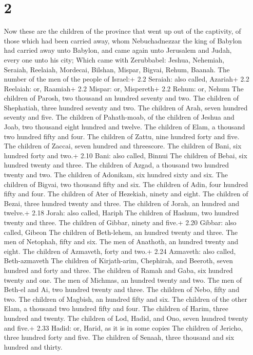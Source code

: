 \hypertarget{section-1}{%
\section{2}\label{section-1}}

 Now these are the children of the province that went up out
of the captivity, of those which had been carried away, whom
Nebuchadnezzar the king of Babylon had carried away unto Babylon, and
came again unto Jerusalem and Judah, every one unto his city;
 Which came with Zerubbabel: Jeshua, Nehemiah, Seraiah,
Reelaiah, Mordecai, Bilshan, Mispar, Bigvai, Rehum, Baanah. The number
of the men of the people of Israel:+ 2.2 Seraiah: also called, Azariah+
2.2 Reelaiah: or, Raamiah+ 2.2 Mispar: or, Mispereth+ 2.2 Rehum: or,
Nehum  The children of Parosh, two thousand an hundred
seventy and two.  The children of Shephatiah, three hundred
seventy and two.  The children of Arah, seven hundred
seventy and five.  The children of Pahath-moab, of the
children of Jeshua and Joab, two thousand eight hundred and twelve.
 The children of Elam, a thousand two hundred fifty and
four.  The children of Zattu, nine hundred forty and five.
 The children of Zaccai, seven hundred and threescore.
 The children of Bani, six hundred forty and two.+ 2.10
Bani: also called, Binnui  The children of Bebai, six
hundred twenty and three.  The children of Azgad, a
thousand two hundred twenty and two.  The children of
Adonikam, six hundred sixty and six.  The children of
Bigvai, two thousand fifty and six.  The children of Adin,
four hundred fifty and four.  The children of Ater of
Hezekiah, ninety and eight.  The children of Bezai, three
hundred twenty and three.  The children of Jorah, an
hundred and twelve.+ 2.18 Jorah: also called, Hariph  The
children of Hashum, two hundred twenty and three.  The
children of Gibbar, ninety and five.+ 2.20 Gibbar: also called, Gibeon
 The children of Beth-lehem, an hundred twenty and three.
 The men of Netophah, fifty and six.  The men
of Anathoth, an hundred twenty and eight.  The children of
Azmaveth, forty and two.+ 2.24 Azmaveth: also called, Beth-azmaveth
 The children of Kirjath-arim, Chephirah, and Beeroth,
seven hundred and forty and three.  The children of Ramah
and Gaba, six hundred twenty and one.  The men of Michmas,
an hundred twenty and two.  The men of Beth-el and Ai, two
hundred twenty and three.  The children of Nebo, fifty and
two.  The children of Magbish, an hundred fifty and six.
 The children of the other Elam, a thousand two hundred
fifty and four.  The children of Harim, three hundred and
twenty.  The children of Lod, Hadid, and Ono, seven hundred
twenty and five.+ 2.33 Hadid: or, Harid, as it is in some copies
 The children of Jericho, three hundred forty and five.
 The children of Senaah, three thousand and six hundred and
thirty.

